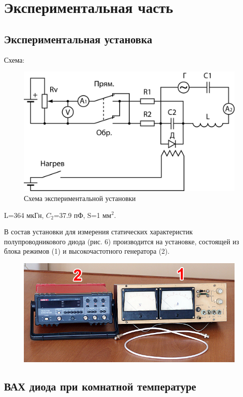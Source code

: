 \section{Экспериментальная часть}
\subsection{Экспериментальная установка}
Схема:
\begin{figure}[h!]
	\centering
	\includegraphics[width=0.5\linewidth]{fig/fig5.jpg}
	\caption{Схема экспериментальной установки}
	\label{fig:5}
\end{figure}

L=364 мкГн, $C_2$=37.9 пФ, S=1 мм$^2$.

В состав установки для измерения статических характеристик полупроводникового диода (рис. 6) производится на установке, состоящей из блока режимов (1) и высокочастотного генератора (2).
\begin{figure}[h!]
	\centering
	\includegraphics[width=0.6\linewidth]{fig/fig6.jpg}
	\caption{}
	\label{fig:6}
\end{figure}

\subsection{ВАХ диода при комнатной температуре}


